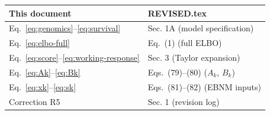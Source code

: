 \documentclass[11pt]{article}
\begin{document}
\begin{center}
\begin{tabular}{ll}
\toprule
\textbf{This document} & \textbf{REVISED.tex} \\
\midrule
Eq.~\eqref{eq:genomics}--\eqref{eq:survival} & Sec. 1A (model specification) \\
Eq.~\eqref{eq:elbo-full} & Eq.~(1) (full ELBO) \\
Eq.~\eqref{eq:score}--\eqref{eq:working-response} & Sec. 3 (Taylor expansion) \\
Eq.~\eqref{eq:Ak}--\eqref{eq:Bk} & Eqs.~(79)--(80) ($A_k$, $B_k$) \\
Eq.~\eqref{eq:xk}--\eqref{eq:sk} & Eqs.~(81)--(82) (EBNM inputs) \\
Correction R5 & Sec. 1 (revision log) \\
\bottomrule
\end{tabular}
\end{center}
\end{document}
